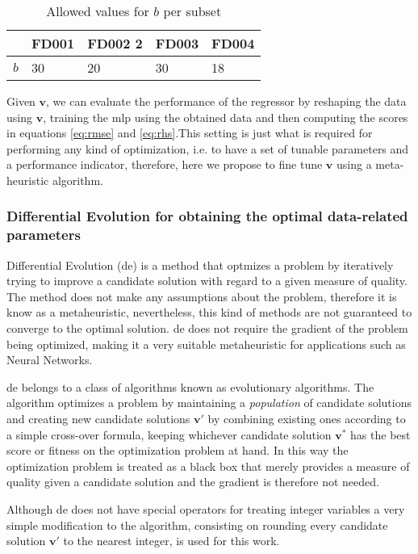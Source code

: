 \begin{table}[!htb]
\centering
\begin{tabular}{l | l l l l}
	\hline
	 & FD001 & FD002 2 & FD003 & FD004\\
  	\hline
  	$b$ & 30 & 20 & 30 & 18\\
  	\hline
\end{tabular}
\caption{Allowed values for $b$ per subset}
\label{table:b_values}
\end{table}

Given $\mathbf{v}$, we can evaluate the performance of the regressor by reshaping the data using $\mathbf{v}$, training the \gls{mlp} using the obtained data and then computing the scores in equations \ref{eq:rmse} and \ref{eq:rhs}.This setting is just what is required for performing any kind of optimization, i.e. to have a set of tunable parameters and a performance indicator, therefore, here we propose to fine tune $\mathbf{v}$ using a meta-heuristic algorithm.

\subsubsection{Differential Evolution for obtaining the optimal data-related parameters}

Differential Evolution (\gls{de}) \cite{Storn1997} is a method that optmizes a problem by iteratively trying to improve a candidate solution with regard to a given measure of quality. The method does not make any assumptions about the problem, therefore it is know as a metaheuristic, nevertheless, this kind of methods are not guaranteed to converge to the optimal solution. \gls{de} does not require the gradient of the problem being optimized, making it a very suitable metaheuristic for applications such as Neural Networks.

\gls{de} belongs to a class of algorithms known as evolutionary algorithms. The algorithm optimizes a problem by maintaining a \textit{population} of candidate solutions and creating new candidate solutions $\mathbf{v}'$ by combining existing ones according to a simple cross-over formula, keeping whichever candidate solution $\mathbf{v}^*$ has the best score or fitness on the optimization problem at hand. In this way the optimization problem is treated as a black box that merely provides a measure of quality given a candidate solution and the gradient is therefore not needed.

Although \gls{de} does not have special operators for treating integer variables a very simple modification to the algorithm, consisting on rounding every candidate solution $\mathbf{v}'$ to the nearest integer, is used for this work.

